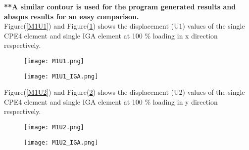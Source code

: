\documentclass[11pt]{article}
\begin{document}
\textbf{**A similar contour is used for the program generated results and abaqus results for an easy comparison. }\\
Figure(\ref{M1U1}) and Figure(\ref{M1U1_IGA}) shows the displacement (U1) values of the single CPE4 element and single IGA element at 100 \% loading in x direction respectively. \\
\begin{figure}[H]
	\centering
	\begin{minipage}{.5\textwidth}
		\centering
		\texttt{[image: M1U1.png]}
		\label{M1U1}
	\end{minipage}%
	\begin{minipage}{.5\textwidth}
		\centering
		\texttt{[image: M1U1\_IGA.png]}
		\label{M1U1_IGA}
	\end{minipage}
\end{figure}
\begin{comment}
		\begin{figure}[H]
		\begin{center}
		\texttt{[image: xyz.png]} 
		\caption{\\CPE4 Element U1}\label{xyz}
		\end{center}	
		\end{figure}
		
		\begin{figure}[H]
		\begin{center}
		\texttt{[image: Figure\_1.png]} 
		\caption{\\IGA Element U1}\label{Figure_1}
		\end{center}	
		\end{figure}
\end{comment}
Figure(\ref{M1U2}) and Figure(\ref{M1U2_IGA}) shows the displacement (U2) values of the single CPE4 element and single IGA element at 100 \% loading in y direction respectively. \\
\begin{figure}[H]
	\centering
	\begin{minipage}{.5\textwidth}
		\centering
		\texttt{[image: M1U2.png]}
		\label{M1U2}
	\end{minipage}%
	\begin{minipage}{.5\textwidth}
		\centering
		\texttt{[image: M1U2\_IGA.png]}
		\label{M1U2_IGA}
	\end{minipage}
\end{figure}
\end{document}
